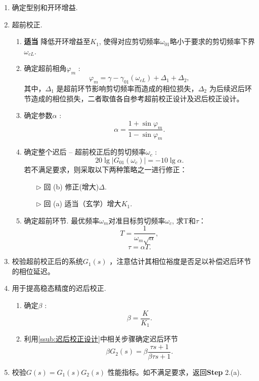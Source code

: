 \documentclass[14pt,a4paper]{article}
\theoremstyle{plain}
\theoremstyle{definition}
\theoremstyle{remark}
\theoremstyle{plain}
\theoremstyle{plain}
\theoremstyle{plain}
\theoremstyle{definition}
\theoremstyle{remark}
\numberwithin{equation}{section}
\begin{document}
				\begin{enumerate}
					\item 确定型别和开环增益. 
					\item 超前校正.
						\begin{enumerate}
							\item \textbf{适当} 降低开环增益至$K_1$, 使得对应剪切频率$\omega_{01}$略小于要求的剪切频率下界$\omega_{cL}$. 
							\item 确定超前相角$\varphi_{m}$ : 
								\[
									\varphi_{m} = \gamma - \gamma_{01}(\omega_{cL}) + \Delta_1 + \Delta_2
								,\] 
								其中，$\Delta_1$ 是超前环节影响剪切频率而造成的相位损失，$\Delta_2$ 为后续迟后环节造成的相位损失，二者取值各自参考超前校正设计及迟后校正设计。
							\item 确定参数$\alpha$ : 
								\[
								\alpha = \dfrac{1+\sin\varphi_{m}}{1-\sin\varphi_{m}} 
								.\] 
							\item 确定整个迟后 -- 超前校正后的剪切频率$\omega_c$ : 
								\[
									20\lg \left| G_{01}(\omega_c) \right| = -10\lg \alpha
								.\] 
								若不满足要求，则采取以下两种策略之一进行修正：
								\begin{itemize}
									\item[$\triangleright$] 回 (b) 修正(增大)$\Delta$. 
									\item[$\triangleright$] 回 (a) 适当（玄学）增大$K_1$. 
								\end{itemize} 
							\item 确定超前环节. 最优频率$\omega_{m}$对准目标剪切频率$\omega_{c}$, 求T和$\tau$：
								\[
								T = \dfrac{1}{\omega_{m}\sqrt{\alpha}}
								,\] 
								\[
								\tau = \alpha T	
								.\]
						\end{enumerate}
					\item 校验超前校正后的系统$G_1(s)$ ，注意估计其相位裕度是否足以补偿迟后环节的相位延迟。
					\item 用于提高稳态精度的迟后校正. 
						\begin{enumerate}
							\item 确定$\beta $ :
								\[
								\beta = \dfrac{K}{K_1}
								.\] 
							\item 利用\ref{ssub:迟后校正设计}中相关步骤确定迟后环节
								\[
									\beta G_2(s) = \beta \dfrac{\tau s+1}{\beta \tau s+1} 
								.\] 
						\end{enumerate} 
					\item 校验$G(s) = G_1(s)G_2(s)$ 性能指标。如不满足要求，返回\textbf{Step} 2.(a). 
				\end{enumerate} 
\end{document}
